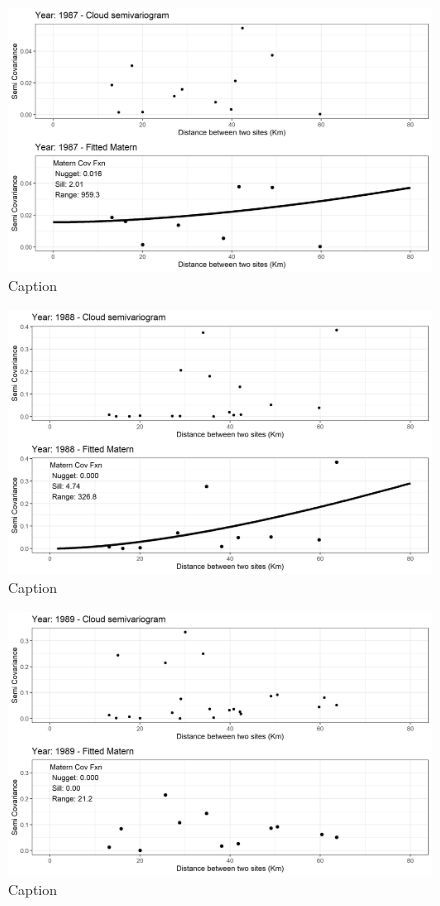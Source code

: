\begin{figure}
    \centering
    \includegraphics{Figures/EmpiricalVariograms/Empirical_Variogram_1987.png}
    \caption{Caption}
    \label{fig:my_label}
\end{figure}

\begin{figure}
    \centering
    \includegraphics{Figures/EmpiricalVariograms/Empirical_Variogram_1988.png}
    \caption{Caption}
    \label{fig:my_label}
\end{figure}

\begin{figure}
    \centering
    \includegraphics{Figures/EmpiricalVariograms/Empirical_Variogram_1989.png}
    \caption{Caption}
    \label{fig:my_label}
\end{figure}

